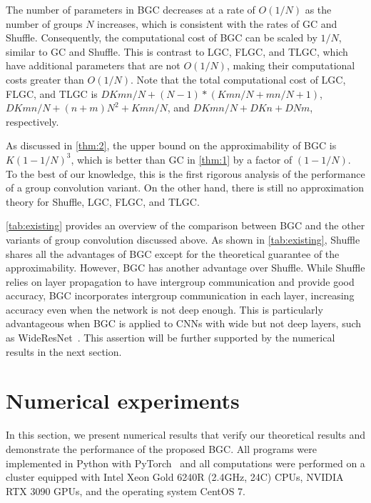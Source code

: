 \documentclass[preprint,12pt,authoryear]{elsarticle}
\numberwithin{equation}{section}
\theoremstyle{remark}
\begin{document}
The number of parameters in BGC decreases at a rate of $O(1/N)$ as the number of groups $N$ increases, which is consistent with the rates of GC and Shuffle.
Consequently, the computational cost of BGC can be scaled by $1/N$, similar to GC and Shuffle.
This is contrast to LGC, FLGC, and TLGC, which have additional parameters that are not $O(1/N)$, making their computational costs greater than $O(1/N)$.
Note that the total computational cost of LGC, FLGC, and TLGC is $DKmn/N + (N-1)*(Kmn/N + mn/N +1)$, $DKmn/N +(n+m)N^{2} + Kmn/N$, and $DKmn/N + DKn + DNm$, respectively.

As discussed in \cref{thm:2}, the upper bound on the approximability of BGC is $K(1-1/N)^3$, which is better than GC in \cref{thm:1} by a factor of $(1-1/N)$.
To the best of our knowledge, this is the first rigorous analysis of the performance of a group convolution variant.
On the other hand, there is still no approximation theory for Shuffle, LGC, FLGC, and TLGC.

\cref{tab:existing} provides an overview of the comparison between BGC and the other variants of group convolution discussed above.
As shown in \cref{tab:existing}, Shuffle~\citep{zhang2018shufflenet} shares all the advantages of BGC except for the theoretical guarantee of the approximability.
However, BGC has another advantage over Shuffle.
While Shuffle relies on layer propagation to have intergroup communication and provide good accuracy, BGC incorporates intergroup communication in each layer, increasing accuracy even when the network is not deep enough.
This is particularly advantageous when BGC is applied to CNNs with wide but not deep layers, such as WideResNet~\citep{zagoruyko2016wide}. 
This assertion will be further supported by the numerical results in the next section.

\section{Numerical experiments}
\label{Sec:Num}
In this section, we present numerical results that verify our theoretical results and demonstrate the performance of the proposed BGC.
All programs were implemented in Python with PyTorch~\citep{paszke2019pytorch} and all computations were performed on a cluster equipped with Intel Xeon Gold 6240R
(2.4GHz, 24C) CPUs, NVIDIA RTX 3090 GPUs, and the operating system CentOS 7.

\end{document}
